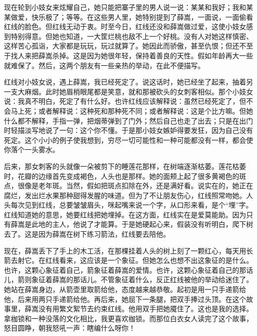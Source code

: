 现在轮到小妓女来炫耀自己，她只能把寨子里的男人说一说：某某和我好；我和某某做爱，快乐极了；等等。在这些男人里，她特别提到了薛嵩，一面说，一面偷看红线的脸色。但红线无动于衷。时至今日，红线还没和薛嵩做过爱，这使小妓女感到特别得意。但她也知道，一大筐烂桃也敌不上一个好桃。没有人对她这样慎密、这样苦心孤诣，大家都是玩玩，玩过就算了。她因此而骄傲，甚至仇恨；但还不至于找人来把薛嵩杀掉。这是因为她很年轻，保持着善良的天性。假如年龄再大一些就难保了。然后，这两个朋友有一些亲热的举动，在此不便描写。 

红线对小妓女说，遇上薛嵩，我已经死定了。说这话时，她已经坐了起来，抽着另一支大麻烟。此时她眉梢眼尾都是笑意，就和那被砍头的女刺客相似。那个小妓女说：我真不明白，死定了有什么好。也许红线应该解释说：虽然已经死定了，但不会马上死；或者解释说：这种死和那种死不同；或者解释说：这是个比方嘛。但她什么都不解释，手指一弹，把烟蒂弹到了门外；然后自己也走了出去；只是在出门时轻描淡写地说了一句：这个你不懂。于是那小妓女嫉妒得要发狂，因为自己没有死定。这个小小的例子使我想到，穷尽一切可能性和一种可能都没有一样，都会使你落个一头雾水。 

后来，那女刺客的头就像一朵被剪下的睡莲花那样，在树端逐渐枯萎。莲花枯萎时，花瓣的边缘首先变成褐色，人头也是那样。她的面颊上起了很多黄褐色的斑点，很像是老年斑。当然，假如把斑点扣除在外，还是满好看。说实在的，她正在腐烂，发出烂水果那种甜得发腥的味道。但为了不让朋友伤心，红线照常吻她。人头每次见到红线，总要皱皱眉头，咪起嘴来说一个字，从口形来看，是个“埋”字。红线知道她的意思，她要红线把她埋掉。在这方面，红线实在是爱莫能助。因为只有薛嵩是此地的主人，他说了才能算。于是她硬起心来，假装没有听明白，爬下树去了。这是因为薛嵩在树下练习箭法，红线要去陪他。 

现在，薛嵩丢下了手上的木工活，在那棵挂着人头的树上刻了一颗红心，每天用长箭去射它。在红线看来，这应该是一个象征。但她怎么也想不出这象征的是什么。也许，这颗心象征着自己，箭象征着薛嵩的爱情。也许，这颗心象征着自己的那话儿，箭则象征着薛嵩的那话儿。不管象征着什么，反正红线被他的举动给迷住了。她站在薛嵩身边，从箭壶里取箭给他，态度越来越恭敬。起初是用一只手递箭给他，后来用两只手递箭给他。再后来，她屈下一条腿，把双手捧过头顶。在这个故事里，薛嵩没有用繁文絮节去约束红线。他用双手把她魇住了。这也是我的选择。拿枷锁和一种没落的文化相比，我更喜欢枷锁。而那位白衣女人读完了这个故事，怒目圆睁，朝我怒吼一声：瞎编什么呀你！

